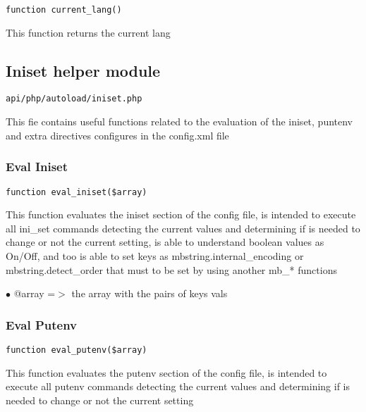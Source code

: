 \documentclass[a4paper]{article}
\begin{document}
\begin{lstlisting}
function current_lang()
\end{lstlisting}

This function returns the current lang

\hypertarget{toc152}{}
\subsection{Iniset helper module}

\begin{lstlisting}
api/php/autoload/iniset.php
\end{lstlisting}

This fie contains useful functions related to the evaluation of the iniset, puntenv and extra
directives configures in the config.xml file

\hypertarget{toc153}{}
\subsubsection{Eval Iniset}

\begin{lstlisting}
function eval_iniset($array)
\end{lstlisting}

This function evaluates the iniset section of the config file, is intended
to execute all ini\_set commands detecting the current values and determining
if is needed to change or not the current setting, is able to understand
boolean values as On/Off, and too is able to set keys as mbstring.internal\_encoding
or mbstring.detect\_order that must to be set by using another mb\_* functions

\begin{compactitem}
\item[\color{myblue}$\bullet$] @array =$>$ the array with the pairs of keys vals
\end{compactitem}

\hypertarget{toc154}{}
\subsubsection{Eval Putenv}

\begin{lstlisting}
function eval_putenv($array)
\end{lstlisting}

This function evaluates the putenv section of the config file, is intended
to execute all putenv commands detecting the current values and determining
if is needed to change or not the current setting
\end{document}

